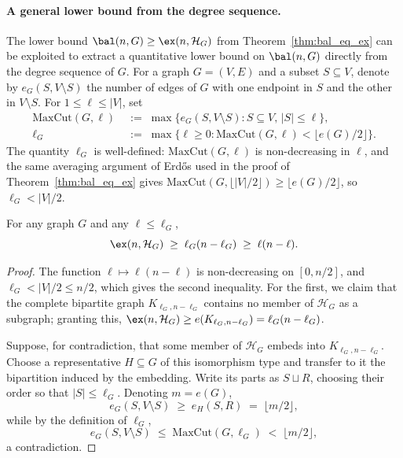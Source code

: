 \paragraph{A general lower bound from the degree sequence.}

The lower bound $\bal(n,G)\geq\ex(n,\mathcal H_G)$ from Theorem~\ref{thm:bal_eq_ex} can be exploited to extract a quantitative lower bound on $\bal(n,G)$ directly from the degree sequence of $G$.
For a graph $G=(V,E)$ and a subset $S\subseteq V$, denote by $e_G(S,V\setminus S)$ the number of edges of $G$ with one endpoint in $S$ and the other in $V\setminus S$.
For $1\leq\ell\leq|V|$, set
\begin{align}
    \mathrm{MaxCut}(G,\ell) &\;:=\; \max\bigl\{e_G(S,V\setminus S):S\subseteq V,\,|S|\leq\ell\bigr\}, \label{eq:maxcut_def}\\
    \ell_G &\;:=\; \max\bigl\{\ell\geq0 : \mathrm{MaxCut}(G,\ell)<\lfloor e(G)/2\rfloor\bigr\}. \label{eq:ellG_def}
\end{align}
The quantity $\ell_G$ is well-defined: $\mathrm{MaxCut}(G,\ell)$ is non-decreasing in $\ell$, and the same averaging argument of Erd\H{o}s used in the proof of Theorem~\ref{thm:bal_eq_ex} gives $\mathrm{MaxCut}(G,\lfloor|V|/2\rfloor)\geq\lfloor e(G)/2\rfloor$, so $\ell_G<|V|/2$.

\begin{lemma}\label{lemma:ex_HG_bipartite}
    For any graph $G$ and any $\ell\leq\ell_G$,
    $$
        \ex(n,\mathcal H_G)\;\geq\;\ell_G(n-\ell_G)\;\geq\;\ell(n-\ell).
    $$
\end{lemma}

\begin{proof}
    The function $\ell\mapsto\ell(n-\ell)$ is non-decreasing on $[0,n/2]$, and $\ell_G<|V|/2\leq n/2$, which gives the second inequality.
    For the first, we claim that the complete bipartite graph $K_{\ell_G,n-\ell_G}$ contains no member of $\mathcal H_G$ as a subgraph; granting this, $\ex(n,\mathcal H_G)\geq e(K_{\ell_G,n-\ell_G})=\ell_G(n-\ell_G)$.

    Suppose, for contradiction, that some member of $\mathcal H_G$ embeds into $K_{\ell_G,n-\ell_G}$.
    Choose a representative $H\subseteq G$ of this isomorphism type and transfer to it the bipartition induced by the embedding.
    Write its parts as $S\sqcup R$, choosing their order so that $|S|\leq\ell_G$.
    Denoting $m=e(G)$,
    $$
        e_G(S,V\setminus S)\;\geq\;e_H(S,R)\;=\;\lfloor m/2\rfloor,
    $$
    while by the definition of $\ell_G$,
    $$
        e_G(S,V\setminus S)\;\leq\;\mathrm{MaxCut}(G,\ell_G)\;<\;\lfloor m/2\rfloor,
    $$
    a contradiction.
\end{proof}

